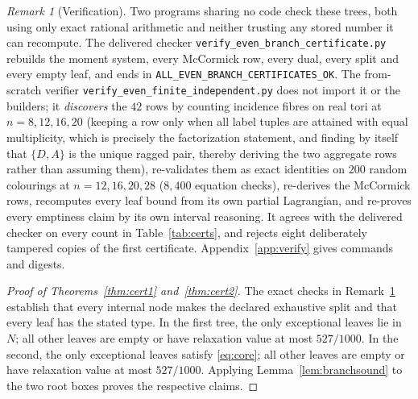 \documentclass[11pt]{amsart}
\theoremstyle{definition}
\theoremstyle{remark}
\newtheorem{remark}[theorem]{Remark}
\newcommand{\bs}{\discretionary{}{}{}}
\begin{document}
\begin{remark}[Verification]\label{rem:certverify}
Two programs sharing no code check these trees, both using only exact rational arithmetic and neither trusting any stored number it can recompute. The delivered checker \texttt{verify\_\bs{}even\_\bs{}branch\_\bs{}certificate.py} rebuilds the moment system, every McCormick row, every dual, every split and every empty leaf, and ends in \texttt{ALL\_\bs{}EVEN\_\bs{}BRANCH\_\bs{}CERTIFICATES\_\bs{}OK}. The from-scratch verifier \texttt{verify\_\bs{}even\_\bs{}finite\_\bs{}independent.py} does not import it or the builders; it \emph{discovers} the $42$ rows by counting incidence fibres on real tori at $n=8,12,16,20$ (keeping a row only when all label tuples are attained with equal multiplicity, which is precisely the factorization statement, and finding by itself that $\{D,A\}$ is the unique ragged pair, thereby deriving the two aggregate rows rather than assuming them), re-validates them as exact identities on $200$ random colourings at $n=12,16,20,28$ ($8{,}400$ equation checks), re-derives the McCormick rows, recomputes every leaf bound from its own partial Lagrangian, and re-proves every emptiness claim by its own interval reasoning. It agrees with the delivered checker on every count in Table~\ref{tab:certs}, and rejects eight deliberately tampered copies of the first certificate. Appendix~\ref{app:verify} gives commands and digests.
\end{remark}

\begin{proof}[Proof of Theorems~\ref{thm:cert1} and~\ref{thm:cert2}]
The exact checks in Remark~\ref{rem:certverify} establish that every internal
node makes the declared exhaustive split and that every leaf has the stated
type.  In the first tree, the only exceptional leaves lie in \(N\); all other
leaves are empty or have relaxation value at most \(527/1000\).  In the
second, the only exceptional leaves satisfy \eqref{eq:core}; all other leaves
are empty or have relaxation value at most \(527/1000\).  Applying
Lemma~\ref{lem:branchsound} to the two root boxes proves the respective
claims.
\end{proof}
\end{document}
